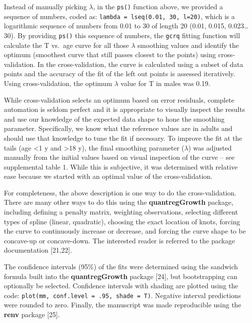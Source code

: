 \documentclass[]{elsarticle} %
\begin{document}
Instead of manually picking \(\lambda\), in the \texttt{ps()} function
above, we provided a sequence of numbers, coded as:
\texttt{lambda\ =\ lseq(0.01,\ 30,\ l=20)}, which is a logarithmic
sequence of numbers from 0.01 to 30 of length 20 (0.01, 0.015,
0.023\ldots30). By providing \texttt{ps()} this sequence of numbers, the
\texttt{gcrq} fitting function will calculate the T vs.~age curve for
all those \(\lambda\) smoothing values and identify the optimum
(smoothest curve that still passes closest to the points) using
cross-validation. In the cross-validation, the curve is calculated using
a subset of data points and the accuracy of the fit of the left out
points is assessed iteratively. Using cross-validation, the optimum
\(\lambda\) value for T in males was 0.19.

While cross-validation selects an optimum based on error residuals,
complete automation is seldom perfect and it is appropriate to visually
inspect the results and use our knowledge of the expected data shape to
hone the smoothing parameter. Specifically, we know what the reference
values are in adults and should use that knowledge to tune the fit if
necessary. To improve the fit at the tails (age \textless1 y and
\textgreater18 y), the final smoothing parameter (\(\lambda\)) was
adjusted manually from the initial values based on visual inspection of
the curve -- see supplemental table 1. While this is subjective, it was
determined with relative ease because we started with an optimal value
of the cross-validation.

For completeness, the above description is one way to do the
cross-validation. There are many other ways to do this using the
\textbf{quantregGrowth} package, including defining a penalty matrix,
weighting observations, selecting different types of spline (linear,
quadratic), choosing the exact location of knots, forcing the curve to
continuously increase or decrease, and forcing the curve shape to be
concave-up or concave-down. The interested reader is referred to the
package documentation {[}21,22{]}.

The confidence intervals (95\%) of the fits were determined using the
sandwich formula built into the \textbf{quantregGrowth} package
{[}24{]}, but bootstrapping can optionally be selected. Confidence
intervals with shading are plotted using the code:
\texttt{plot(mm,\ conf.level\ =\ .95,\ shade\ =\ T)}. Negative interval
predictions were rounded to zero. Finally, the manuscript was made
reproducible using the \textbf{renv} package {[}25{]}.
\end{document}
